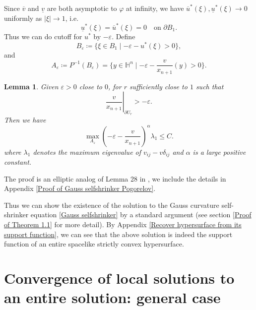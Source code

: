 \documentclass[reqno]{amsart}
\newtheorem{lemma}[theorem]{Lemma}
\theoremstyle{remark}
\theoremstyle{definition}
\numberwithin{equation}{section}
\begin{document}
Since $\overline{v}$ and $\underline{v}$ are both asymptotic to $\varphi$ at infinity, we have $\overline{u}^*(\xi), \underline{u}^*(\xi) \to 0$ uniformly as $|\xi| \to 1$, i.e.
\[
\underline{u}^*(\xi) = \overline{u}^*(\xi) = 0 \quad \text{on } \partial B_1.
\]
Thus we can do cutoff for $u^*$ by $-\varepsilon$. Define 
\[
B_{\varepsilon} \coloneqq \{\xi \in B_1 \mid -\varepsilon - u^*(\xi) > 0\}, 
\]
and
\[
A_{\varepsilon} \coloneqq P^{-1} (B_{\varepsilon}) = \{y \in \mathbb{H}^n \mid -\varepsilon - \frac{v}{x_{n+1}}(y) > 0\}.
\]
\begin{lemma}\label{Gauss selfshrinker Pogorelov}
    Given $\varepsilon>0$ close to $0$, for $r$ sufficiently close to $1$ such that 
    \[
    \left. \frac{v}{x_{n+1}}\right|_{\partial U_r} > -\varepsilon.
    \]
    Then we have
    \[
    \max_{A_{\varepsilon}} \left( -\varepsilon -  \frac{v}{x_{n+1}} \right)^{\alpha} \lambda_1 \leqslant C.
    \]
    where $\lambda_1$ denotes the maximum eigenvalue of $v_{ij}-v\delta_{ij}$ and $\alpha$ is a large positive constant.
\end{lemma}

The proof is an elliptic analog of Lemma 28 in \cite{Entireconvexcurvatureflow}, we include the details in Appendix \ref{Proof of Gauss selfshrinker Pogorelov}.

Thus we can show the existence of the solution to the Gauss curvature self-shrinker equation \eqref{Gauss selfshrinker} by a standard argument (see section \ref{Proof of Theorem 1.1} for more detail). By Appendix \ref{Recover hypersurface from its support function}, we can see that the above solution is indeed the support function of an entire spacelike strictly convex hypersurface.


\section{Convergence of local solutions to an entire solution: general case}
\end{document}
